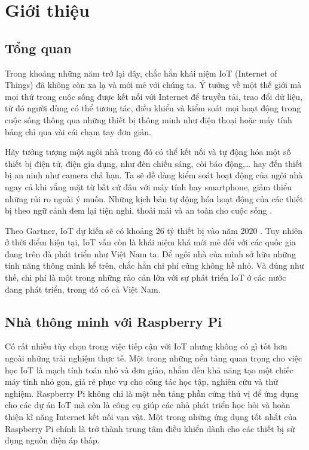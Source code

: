\documentclass[12pt,a4paper,oneside]{extbook}
\begin{document}
\renewcommand{\listfigurename}{Danh mục hình ảnh}
\listoffigures
{}

\mainmatter

\chapter{Giới thiệu}

\section{Tổng quan}
Trong khoảng những năm trở lại đây, chắc hẳn khái niệm IoT (Internet of Things) đã không còn xa lạ và mới mẻ với chúng ta. Ý tưởng về một thế giới mà mọi thứ trong cuộc sống được kết nối với Internet để truyền tải, trao đổi dữ liệu, từ đó người dùng có thể tương tác, điều khiển và kiểm soát mọi hoạt động trong cuộc sống thông qua những thiết bị thông minh như điện thoại hoặc máy tính bảng chỉ qua vài cái chạm tay đơn giản.

Hãy tưởng tượng một ngôi nhà trong đó có thể kết nối và tự động hóa một số thiết bị điện tử, điện gia dụng, như đèn chiếu sáng, còi báo động,\dots\hspace{0mm} hay đến thiết bị an ninh như camera chả hạn. Ta sẽ dễ dàng kiểm soát hoạt động của ngôi nhà ngay cả khi vắng mặt từ bất cứ đâu với máy tính hay smartphone, giảm thiểu những rủi ro ngoài ý muốn. Những kịch bản tự động hóa hoạt động của các thiết bị theo ngữ cảnh đem lại tiện nghi, thoải mái và an toàn cho cuộc sống \cite{smarthome-trend}.

Theo Gartner, IoT dự kiến sẽ có khoảng 26 tỷ thiết bị vào năm 2020 \cite{gartner}. Tuy nhiên ở thời điểm hiện tại, IoT vẫn còn là khái niệm khá mới mẻ đối với các quốc gia đang trên đà phát triển như Việt Nam ta. Để ngôi nhà của mình sở hữu những tính năng thông minh kể trên, chắc hẳn chi phí cũng không hề nhỏ. Và đúng như thế, chi phí là một trong những rào cản lớn với sự phát triển IoT ở các nước đang phát triển, trong đó có cả Việt Nam.

\section{Nhà thông minh với Raspberry Pi}
Có rất nhiều tùy chọn trong việc tiếp cận với IoT nhưng không có gì tốt hơn ngoài những trải nghiệm thực tế. Một trong những nển tảng quan trọng cho việc học IoT là mạch tính toán nhỏ và đơn giản, nhắm đến khả năng tạo một chiếc máy tính nhỏ gọn, giá rẻ phục vụ cho công tác học tập, nghiên cứu và thử nghiệm. Raspberry Pi không chỉ là một nền tảng phần cứng thú vị để ứng dụng cho các dự án IoT mà còn là công cụ giúp các nhà phát triển học hỏi và hoàn thiện kĩ năng Internet kết nối vạn vật. Một trong những ứng dụng tốt nhất của Raspberry Pi chính là trở thành trung tâm điều khiển dành cho các thiết bị sử dụng nguồn điện áp thấp.
\end{document}
